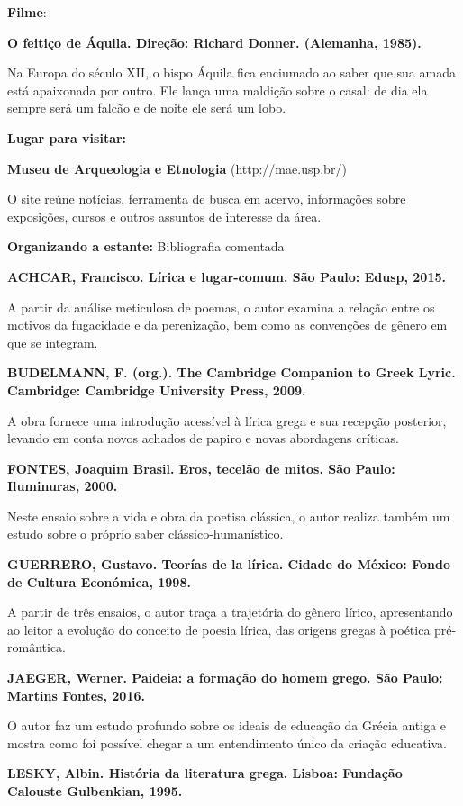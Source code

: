\documentclass[12pt]{extarticle}
\begin{document}
\textbf{Filme}:

\textbf{O feitiço de Áquila. Direção: Richard Donner. (Alemanha, 1985).}

Na Europa do século XII, o bispo Áquila fica enciumado ao saber que sua
amada está apaixonada por outro. Ele lança uma maldição sobre o casal:
de dia ela sempre será um falcão e de noite ele será um lobo.

\textbf{Lugar para visitar:}

\textbf{Museu de Arqueologia e Etnologia} (http://mae.usp.br/)

O site reúne notícias, ferramenta de busca em acervo, informações sobre
exposições, cursos e outros assuntos de interesse da área.

\textbf{Organizando a estante:} Bibliografia comentada

\textbf{ACHCAR, Francisco. Lírica e lugar-comum. São Paulo: Edusp,
2015.}

A partir da análise meticulosa de poemas, o autor examina a relação
entre os motivos da fugacidade e da perenização, bem como as convenções
de gênero em que se integram.

\textbf{BUDELMANN, F. (org.). The Cambridge Companion to Greek Lyric.
Cambridge: Cambridge University Press, 2009.}

A obra fornece uma introdução acessível à lírica grega e sua recepção
posterior, levando em conta novos achados de papiro e novas abordagens
críticas.

\textbf{FONTES, Joaquim Brasil. Eros, tecelão de mitos. São Paulo:
Iluminuras, 2000.}

Neste ensaio sobre a vida e obra da poetisa clássica, o autor realiza
também um estudo sobre o próprio saber clássico-humanístico.

\textbf{GUERRERO, Gustavo. Teorías de la lírica. Cidade do México: Fondo
de Cultura Económica, 1998.}

A partir de três ensaios, o autor traça a trajetória do gênero lírico,
apresentando ao leitor a evolução do conceito de poesia lírica, das
origens gregas à poética pré-romântica.

\textbf{JAEGER, Werner. Paideia: a formação do homem grego. São Paulo:
Martins Fontes, 2016.}

O autor faz um estudo profundo sobre os ideais de educação da Grécia
antiga e mostra como foi possível chegar a um entendimento único da
criação educativa.

\textbf{LESKY, Albin. História da literatura grega. Lisboa: Fundação
Calouste Gulbenkian, 1995.}
\end{document}
